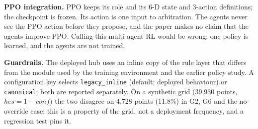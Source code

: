 \textbf{PPO integration.} PPO keeps its role and its 6-D state and 3-action definitions; the checkpoint is frozen. Its action is one input to arbitration. The agents never see the PPO action before they propose, and the paper makes no claim that the agents improve PPO. Calling this multi-agent RL would be wrong: one policy is learned, and the agents are not trained.

\textbf{Guardrails.} The deployed hub uses an inline copy of the rule layer that differs from the module used by the training environment and the earlier policy study. A configuration key selects \texttt{legacy\_inline} (default; deployed behaviour) or \texttt{canonical}; both are reported separately. On a synthetic grid (39,930 points, $\mathit{hes}=1-\mathit{conf}$) the two disagree on 4,728 points (11.8\%) in G2, G6 and the no-override case; this is a property of the grid, not a deployment frequency, and a regression test pins it.

